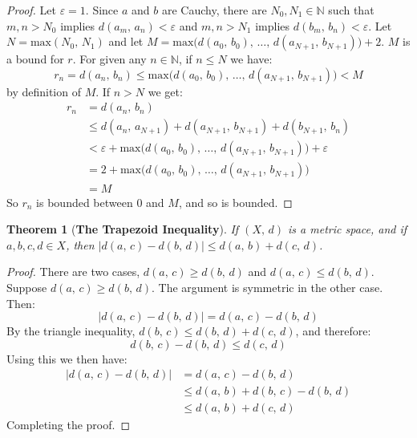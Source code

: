\documentclass{article}
\theoremstyle{plain}
\newtheorem{theorem}{Theorem}
\theoremstyle{normal}
\begin{document}
    \begin{proof}
        Let $\varepsilon=1$. Since $a$ and $b$ are Cauchy, there are
        $N_{0},N_{1}\in\mathbb{N}$ such that $m,n>N_{0}$ implies
        $d(a_{m},\,a_{n})<\varepsilon$ and $m,n>N_{1}$ implies
        $d(b_{m},\,b_{n})<\varepsilon$. Let $N=\textrm{max}(N_{0},\,N_{1})$
        and let
        $M=\textrm{max}\big(d(a_{0},\,b_{0}),\,\dots,\,d(a_{N+1},\,b_{N+1})\big)+2$.
        $M$ is a bound for $r$. For given any $n\in\mathbb{N}$, if $n\leq{N}$
        we have:
        \begin{equation}
            r_{n}=d(a_{n},\,b_{n})\leq\textrm{max}
                \big(d(a_{0},\,b_{0}),\,\dots,\,d(a_{N+1},\,b_{N+1})\big)
                <M
        \end{equation}
        by definition of $M$. If $n>N$ we get:
        \begin{align}
            r_{n}
            &=d(a_{n},\,b_{n})\\
            &\leq{d}(a_{n},\,a_{N+1})+d(a_{N+1},\,b_{N+1})
                +d(b_{N+1},\,b_{n})\\
            &<\varepsilon+
                \textrm{max}\big(d(a_{0},\,b_{0}),\,\dots,\,d(a_{N+1},\,b_{N+1})\big)+
                \varepsilon\\
            &=2+\textrm{max}\big(d(a_{0},\,b_{0}),\,\dots,\,d(a_{N+1},\,b_{N+1})\big)\\
            &=M
        \end{align}
        So $r_{n}$ is bounded between $0$ and $M$, and so is bounded.
    \end{proof}
    \begin{theorem}[\textbf{The Trapezoid Inequality}]
        If $(X,\,d)$ is a metric space, and if
        $a,b,c,d\in{X}$, then $|d(a,\,c)-d(b,\,d)|\leq{d}(a,\,b)+d(c,\,d)$.
    \end{theorem}
    \begin{proof}
        There are two cases, $d(a,\,c)\geq{d}(b,\,d)$ and
        $d(a,\,c)\leq{d}(b,\,d)$. Suppose $d(a,\,c)\geq{d}(b,\,d)$. The
        argument is symmetric in the other case. Then:
        \begin{equation}
            |d(a,\,c)-d(b,\,d)|=d(a,\,c)-d(b,\,d)
        \end{equation}
        By the triangle inequality,
        $d(b,\,c)\leq{d}(b,\,d)+d(c,\,d)$, and therefore:
        \begin{equation}
            d(b,\,c)-d(b,\,d)\leq{d}(c,\,d)
        \end{equation}
        Using this we then have:
        \begin{align}
            |d(a,\,c)-d(b,\,d)|
            &=d(a,\,c)-d(b,\,d)\\
            &\leq{d}(a,\,b)+d(b,\,c)-d(b,\,d)\\
            &\leq{d}(a,\,b)+d(c,\,d)
        \end{align}
        Completing the proof.
    \end{proof}
\end{document}

